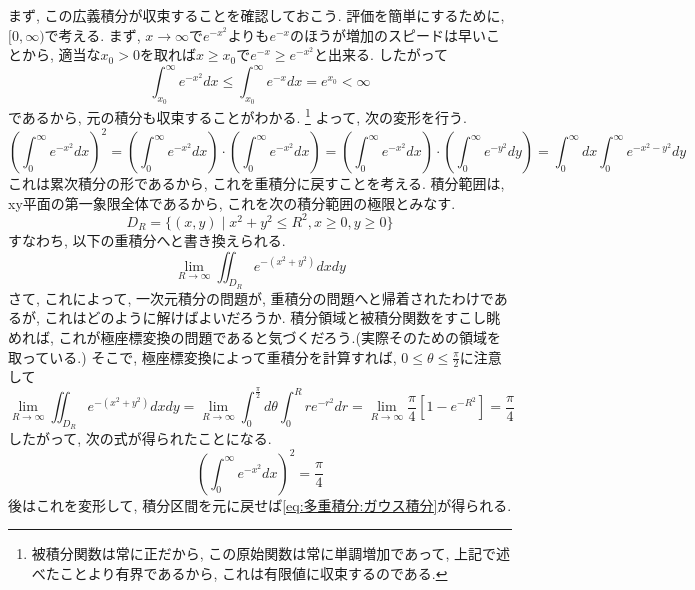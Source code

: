 \documentclass[a4j,dvipdfmx]{jsarticle}
\numberwithin{equation}{section}
\begin{document}
            まず, この広義積分が収束することを確認しておこう. 評価を簡単にするために, $[0,\infty)$で考える. まず, $x\to\infty$で$e^{-x^2}$よりも$e^{-x}$のほうが増加のスピードは早いことから,
            適当な$x_0>0$を取れば$x\geq x_0$で$e^{-x}\geq e^{-x^2}$と出来る. したがって
            \begin{equation*}
                \int_{x_0}^{\infty}e^{-x^2}dx\leq \int_{x_0}^{\infty}e^{-x}dx = e^{x_0} < \infty
            \end{equation*}
            であるから, 元の積分も収束することがわかる. \footnote{被積分関数は常に正だから, この原始関数は常に単調増加であって, 上記で述べたことより有界であるから, これは有限値に収束するのである.}
            よって, 次の変形を行う.
            \begin{equation*}
                \left(\int_{0}^{\infty}e^{-x^2}dx\right)^2 = \left(\int_{0}^{\infty}e^{-x^2}dx\right)\cdot \left(\int_{0}^{\infty}e^{-x^2}dx\right)=\left(\int_{0}^{\infty}e^{-x^2}dx\right)\cdot \left(\int_{0}^{\infty}e^{-y^2}dy\right)=\int_0^\infty dx\int_0^\infty e^{-x^2-y^2}dy
            \end{equation*}
            これは累次積分の形であるから, これを重積分に戻すことを考える. 積分範囲は, xy平面の第一象限全体であるから, これを次の積分範囲の極限とみなす.
            \begin{equation*}
                D_R = \{(x,y)\mid x^2+y^2\leq R^2,x\geq 0,y\geq 0\}
            \end{equation*}
            すなわち, 以下の重積分へと書き換えられる.
            \begin{equation*}
                \lim_{R\to\infty}\iint_{D_R} e^{-(x^2+y^2)}dxdy
            \end{equation*}
            さて, これによって, 一次元積分の問題が, 重積分の問題へと帰着されたわけであるが, これはどのように解けばよいだろうか. 
            積分領域と被積分関数をすこし眺めれば, これが極座標変換の問題であると気づくだろう.(実際そのための領域を取っている.)
            そこで, 極座標変換によって重積分を計算すれば, $0\leq\theta\leq\frac{\pi}{2}$に注意して
            \begin{equation*}
                \lim_{R\to\infty}\iint_{D_R} e^{-(x^2+y^2)}dxdy = \lim_{R\to\infty}\int_{0}^{\frac{\pi}{2}}d\theta\int_{0}^{R}re^{-r^2}dr=\lim_{R\to\infty}\frac{\pi}{4}\left[1-e^{-R^2}\right]=\frac{\pi}{4}
            \end{equation*}
            \clearpage
            したがって, 次の式が得られたことになる.
            \begin{equation*}
                \left(\int_{0}^{\infty}e^{-x^2}dx\right)^2 = \frac{\pi}{4}
            \end{equation*}
            後はこれを変形して, 積分区間を元に戻せば\eqref{eq:多重積分:ガウス積分}が得られる.\\
\end{document}
